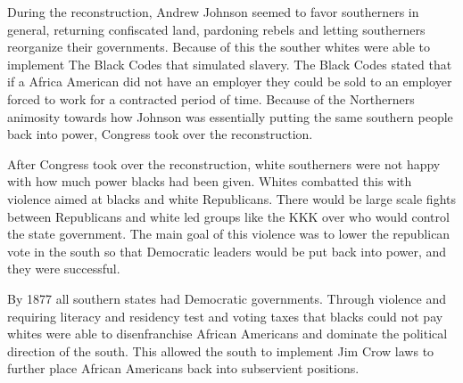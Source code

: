 During the reconstruction, Andrew Johnson seemed to favor southerners in general, returning confiscated land, pardoning rebels and letting southerners reorganize their governments.
Because of this the souther whites were able to implement The Black Codes that simulated slavery.
The Black Codes stated that if a Africa American did not have an employer they could be sold to an employer forced to work for a contracted period of time.
Because of the Northerners animosity towards how Johnson was essentially putting the same southern people back into power, Congress took over the reconstruction.

After Congress took over the reconstruction, white southerners were not happy with how much power blacks had been given.
Whites combatted this with violence aimed at blacks and white Republicans. There would be large scale fights between Republicans and white led groups like the KKK over who would control the state government. The main goal of this violence was to lower the republican vote in the south so that Democratic leaders would be put back into power, and they were successful.

By 1877 all southern states had Democratic governments. Through violence and requiring literacy and residency test and voting taxes that blacks could not pay whites were able to disenfranchise African Americans and dominate the political direction of the south. This allowed the south to implement Jim Crow laws to further place African Americans back into subservient positions.